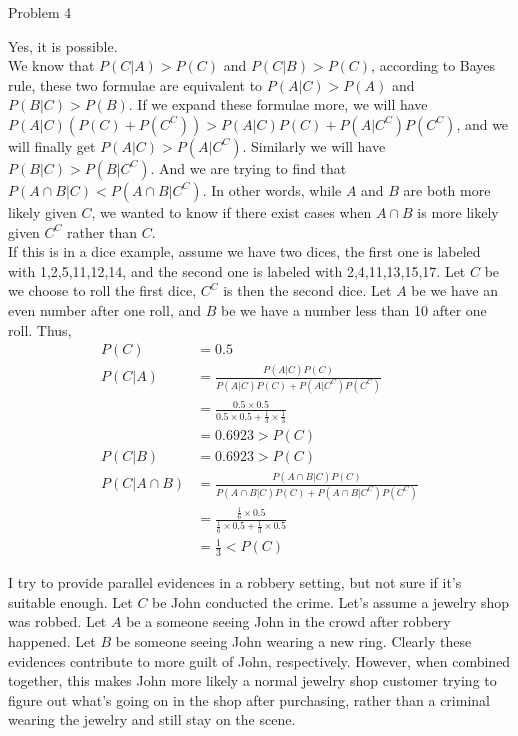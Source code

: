 \documentclass[12pt,letterpaper, onecolumn]{exam}
\begin{document}
\begin{questions}
    \question Problem 4
    \begin{solution}
        Yes, it is possible.\\
        We know that $P(C|A) > P(C)$ and $P(C|B) > P(C)$, according to Bayes rule, these two formulae are equivalent to $P(A|C) > P(A)$ and $P(B|C) > P(B)$. If we expand these formulae more, we will have $P(A|C)(P(C)+P(C^C)) > P(A|C)P(C) + P(A|C^C)P(C^C)$, and we will finally get $P(A|C) > P(A|C^C)$. Similarly we will have $P(B|C) > P(B|C^C)$. And we are trying to find that $P(A \cap B|C)<P(A \cap B|C^C)$. In other words, while $A$ and $B$ are both more likely given $C$, we wanted to know if there exist cases when $A \cap B$ is more likely given $C^C$ rather than $C$. \\
        If this is in a dice example, assume we have two dices, the first one is labeled with 1,2,5,11,12,14, and the second one is labeled with 2,4,11,13,15,17. Let $C$ be we choose to roll the first dice, $C^C$ is then the second dice. Let $A$ be we have an even number after one roll, and $B$ be we have a number less than 10 after one roll. Thus,
        \begin{align*}
            P(C) & = 0.5 \\
            P(C|A) & = \frac{P(A|C)P(C)}{P(A|C)P(C)+P(A|C^C)P(C^C)} \\
            & = \frac{0.5 \times 0.5}{0.5 \times 0.5+\frac{1}{3} \times \frac{1}{3}} \\
            & = 0.6923 > P(C) \\
            P(C|B) & = 0.6923 > P(C) \\
            P(C|A \cap B) & = \frac{P(A\cap B|C)P(C)}{P(A\cap B|C)P(C)+P(A\cap B|C^C)P(C^C)} \\
            & = \frac{\frac{1}{6} \times 0.5}{\frac{1}{6} \times 0.5 + \frac{1}{3} \times 0.5} \\
            & = \frac{1}{3} < P(C)
        \end{align*}
        
        I try to provide parallel evidences in a robbery setting, but not sure if it's suitable enough. Let $C$ be John conducted the crime. Let's assume a jewelry shop was robbed. Let $A$ be a someone seeing John in the crowd after robbery happened. Let $B$ be someone seeing John wearing a new ring. Clearly these evidences contribute to more guilt of John, respectively. However, when combined together, this makes John more likely a normal jewelry shop customer trying to figure out what's going on in the shop after purchasing, rather than a criminal wearing the jewelry and still stay on the scene.
        

\end{solution}
\end{questions}
\end{document}
